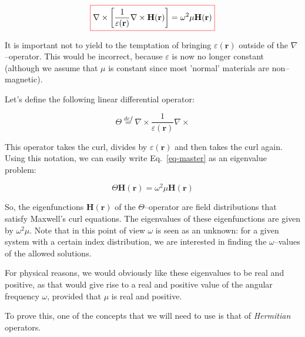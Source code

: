 \begin{equation}
\fbox{$\displaystyle
\nabla \times \left[ \frac{1}{\varepsilon({\mathbf r})}\nabla \times {\mathbf H({\mathbf r})}  \right ] = \omega^2 \mu {\mathbf H({\mathbf r})} \label{eq-master}
$}
\end{equation} 

It is important not to yield to the temptation of bringing $\varepsilon({\mathbf r})$  outside of the $\nabla$--operator. This would be incorrect, because $\varepsilon$ is now no longer constant (although we assume that $\mu$ is constant since most 'normal' materials are non--magnetic).

Let's define the following linear differential operator:

\begin{equation}
\Theta \stackrel{def}{=} \nabla \times  \frac{1}{\varepsilon({\mathbf r})}\nabla \times
\end{equation} 

This operator takes the curl, divides by $\varepsilon({\mathbf r})$ and then takes the curl again. Using this notation, we can easily write Eq.~\ref{eq-master} as an eigenvalue problem:

\begin{equation}
\Theta {\mathbf H({\mathbf r})} = \omega^2 \mu {\mathbf H({\mathbf r})}
\end{equation} 

So, the eigenfunctions ${\mathbf H({\mathbf r})}$ of the $\Theta$--operator are field distributions that satisfy Maxwell's curl equations. The eigenvalues of these eigenfunctions are given by $\omega^2 \mu$. Note that in this point of view $\omega$ is seen as an unknown: for a given system with a certain index distribution, we are interested in finding the  $\omega$--values of the allowed solutions.

For physical reasons, we would obviously like these eigenvalues to be real and positive, as that would give rise to a real and positive value of the angular frequency $\omega$, provided that $\mu$ is real and positive.

To prove this, one of the concepts that we will need to use is that of \emph{Hermitian} operators.

\pagebreak


